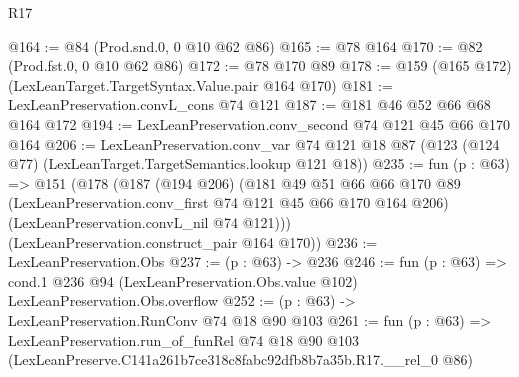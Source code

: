 \begin{lexlean}{R17}
\begin{coremodule}
@164 := @84 (Prod.snd.{0, 0} @10 @62 @86)
@165 := @78 @164
@170 := @82 (Prod.fst.{0, 0} @10 @62 @86)
@172 := @78 @170 @89
@178 := @159 (@165 @172) (LexLeanTarget.TargetSyntax.Value.pair @164 @170)
@181 := LexLeanPreservation.convL_cons @74 @121
@187 := @181 @46 @52 @66 @68 @164 @172
@194 := LexLeanPreservation.conv_second @74 @121 @45 @66 @170 @164
@206 := LexLeanPreservation.conv_var
    @74
    @121
    @18
    @87
    (@123 (@124 @77) (LexLeanTarget.TargetSemantics.lookup @121 @18))
@235 := fun (p : @63) =>
  @151
    (@178
      (@187
        (@194 @206)
        (@181
          @49
          @51
          @66
          @66
          @170
          @89
          (LexLeanPreservation.conv_first @74 @121 @45 @66 @170 @164 @206)
          (LexLeanPreservation.convL_nil @74 @121)))
      (LexLeanPreservation.construct_pair @164 @170))
@236 := LexLeanPreservation.Obs
@237 := (p : @63) -> @236
@246 := fun (p : @63) =>
  cond.{1} @236 @94 (LexLeanPreservation.Obs.value @102) LexLeanPreservation.Obs.overflow
@252 := (p : @63) -> LexLeanPreservation.RunConv @74 @18 @90 @103
@261 := fun (p : @63) =>
  LexLeanPreservation.run_of_funRel
    @74
    @18
    @90
    @103
    (LexLeanPreserve.C141a261b7ce318c8fabc92dfb8b7a35b.R17.__rel_0 @86)
\end{coremodule}
\end{lexlean}

